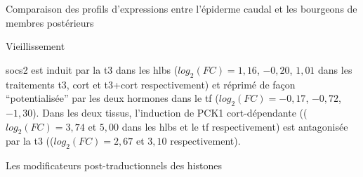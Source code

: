 \documentclass[../main.tex]{subfiles}
\begin{document}
\begin{chapter}{Comparaison des profils d'expressions entre l'épiderme caudal et les bourgeons de membres postérieurs}
\begin{section}{Vieillissement}
\begin{itemize}
\end{itemize}
\par
\gls{socs2} est induit par la \gls{t3} dans les \glspl{hlb} ($log_2(FC)=1,16$, $-0,20$, $1,01$ dans les traitements \gls{t3}, \gls{cort} et \gls{t3}+\gls{cort} respectivement) et réprimé de façon ``potentialisée'' par les deux hormones dans le \gls{tf} ($log_2(FC)=-0,17$, $-0,72$, $-1,30$).
Dans les deux tissus, l'induction de PCK1 \gls{cort}-dépendante (($log_2(FC)=3,74$ et $5,00$ dans les \glspl{hlb} et le \gls{tf} respectivement) est antagonisée par la \gls{t3} (($log_2(FC)=2,67$ et $3,10$ respectivement).



\end{section}


\begin{section}{Les modificateurs post-traductionnels des histones}\label{sec:res-histones}


\end{section}
\end{chapter}
\end{document}
